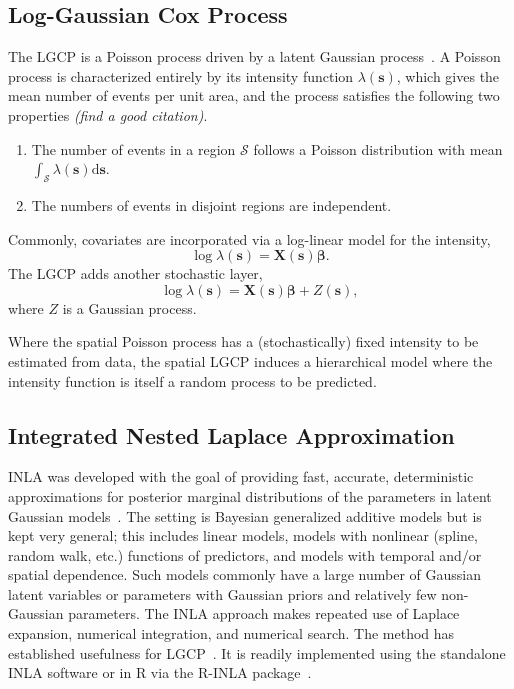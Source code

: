 \documentclass[]{interact}
\begin{document}
\subsection{Log-Gaussian Cox Process}

The LGCP is a Poisson process driven by a latent Gaussian
process~\cite{moelleretal}. A Poisson process is characterized entirely by its
intensity function \(\lambda(\mathbf{s})\), which gives the mean number of events
per unit area, and the process satisfies the following two properties
{\it (find a good citation)}.
\begin{enumerate}
\item The number of events in a region \(\mathcal{S}\) follows a Poisson
distribution with mean
\(\int_{\mathcal{S}} \lambda(\mathbf{s})\mathrm{d}\mathbf{s}\).
\item The numbers of events in disjoint regions are independent.
\end{enumerate}

Commonly, covariates are incorporated via a log-linear model for the intensity,
\begin{displaymath}
\log\lambda(\mathbf{s}) = \mathbf{X}(\mathbf{s}) \boldsymbol{\beta}.
\end{displaymath}
The LGCP adds another stochastic layer,
\begin{displaymath}
\log\lambda(\mathbf{s}) = \mathbf{X}(\mathbf{s}) \boldsymbol{\beta}
+ Z(\mathbf{s}),
\end{displaymath}
where \(Z\) is a Gaussian process.

Where the spatial Poisson process has a (stochastically) fixed intensity to be
estimated from data, the spatial LGCP induces a hierarchical model where the
intensity function is itself a random process to be predicted.



\subsection{Integrated Nested Laplace Approximation}

INLA was developed with the goal of providing fast, accurate, deterministic
approximations for posterior marginal distributions of the parameters in
latent Gaussian models~\cite{rueetal}. The setting is Bayesian generalized
additive models but is kept very general; this includes linear models, models
with nonlinear (spline, random walk, etc.) functions of predictors, and models
with temporal and/or spatial dependence. Such models commonly have a large
number of Gaussian latent variables or parameters with Gaussian priors and
relatively few non-Gaussian parameters. The INLA approach makes repeated use
of Laplace expansion, numerical integration, and numerical search. The method
has established usefulness for LGCP~\cite{illianetal}. It is readily
implemented using the standalone INLA software or in R via the
R-INLA package~\cite{inlar}.
\end{document}

